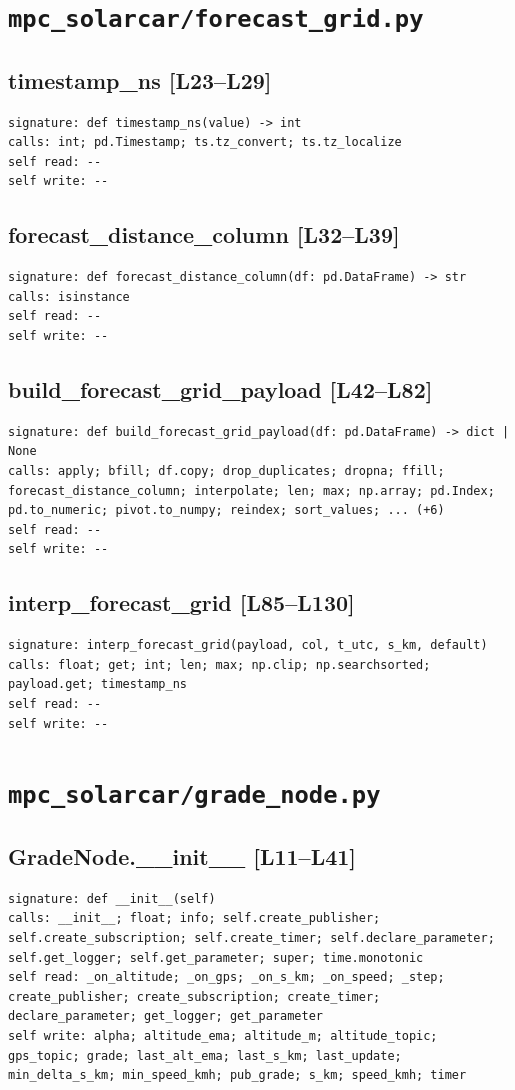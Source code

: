 \documentclass[a4paper,10pt,oneside]{book}
\begin{document}
\section{\texttt{mpc\_solarcar/forecast\_grid.py}}
\subsection*{timestamp\_ns [L23--L29]}
\begin{lstlisting}[numbers=none]
signature: def timestamp_ns(value) -> int
calls: int; pd.Timestamp; ts.tz_convert; ts.tz_localize
self read: --
self write: --
\end{lstlisting}
\subsection*{forecast\_distance\_column [L32--L39]}
\begin{lstlisting}[numbers=none]
signature: def forecast_distance_column(df: pd.DataFrame) -> str
calls: isinstance
self read: --
self write: --
\end{lstlisting}
\subsection*{build\_forecast\_grid\_payload [L42--L82]}
\begin{lstlisting}[numbers=none]
signature: def build_forecast_grid_payload(df: pd.DataFrame) -> dict | None
calls: apply; bfill; df.copy; drop_duplicates; dropna; ffill; forecast_distance_column; interpolate; len; max; np.array; pd.Index; pd.to_numeric; pivot.to_numpy; reindex; sort_values; ... (+6)
self read: --
self write: --
\end{lstlisting}
\subsection*{interp\_forecast\_grid [L85--L130]}
\begin{lstlisting}[numbers=none]
signature: interp_forecast_grid(payload, col, t_utc, s_km, default)
calls: float; get; int; len; max; np.clip; np.searchsorted; payload.get; timestamp_ns
self read: --
self write: --
\end{lstlisting}
\section{\texttt{mpc\_solarcar/grade\_node.py}}
\subsection*{GradeNode.\_\_init\_\_ [L11--L41]}
\begin{lstlisting}[numbers=none]
signature: def __init__(self)
calls: __init__; float; info; self.create_publisher; self.create_subscription; self.create_timer; self.declare_parameter; self.get_logger; self.get_parameter; super; time.monotonic
self read: _on_altitude; _on_gps; _on_s_km; _on_speed; _step; create_publisher; create_subscription; create_timer; declare_parameter; get_logger; get_parameter
self write: alpha; altitude_ema; altitude_m; altitude_topic; gps_topic; grade; last_alt_ema; last_s_km; last_update; min_delta_s_km; min_speed_kmh; pub_grade; s_km; speed_kmh; timer
\end{lstlisting}
\end{document}
